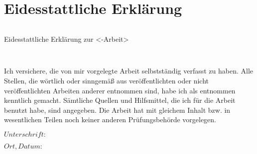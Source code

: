 \section*{Eidesstattliche Erklärung}
\thispagestyle{empty}

\begin{verbatim}

\end{verbatim}

\begin{LARGE}Eidesstattliche Erklärung zur <-Arbeit>\end{LARGE}
\begin{verbatim}


\end{verbatim}
Ich versichere, die von mir vorgelegte Arbeit selbstständig verfasst zu haben. Alle Stellen, die wörtlich oder sinngemäß aus veröffentlichten oder nicht veröffentlichten Arbeiten anderer entnommen sind, habe ich als entnommen kenntlich gemacht. Sämtliche Quellen und Hilfsmittel, die ich für die Arbeit benutzt habe, sind angegeben. Die Arbeit hat mit gleichem Inhalt bzw. in wesentlichen Teilen noch keiner anderen Prüfungsbehörde vorgelegen.

\vspace{1.5em}
\noindent
\begin{multicols}{2}
    \noindent
    \begin{minipage}{\dimexpr(0.5\textwidth - 5.0pt)}
        $Unterschrift:$
    \end{minipage}
    \noindent
    \begin{minipage}{\dimexpr(0.5\textwidth - 5.0pt)}
        $Ort, Datum:$
    \end{minipage}
\end{multicols}

